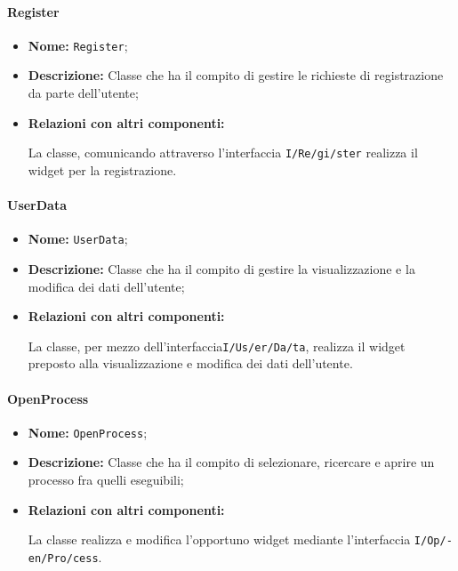 \paragraph{Register}
\begin{flushleft}
\begin{itemize}
\item \textbf{Nome:} \texttt{Register};
\item \textbf{Descrizione:} Classe che ha il compito di gestire le richieste di registrazione da parte dell'utente;
\item \textbf{Relazioni con altri componenti:}
\begin{sloppypar}
La classe, comunicando attraverso l'interfaccia \texttt{I\fshyp{}Re\fshyp{}gi\fshyp{}ster} realizza il widget per la registrazione.
\end{sloppypar}
\end{itemize}
\end{flushleft}

\paragraph{UserData}
\begin{flushleft}
\begin{itemize}
\item \textbf{Nome:} \texttt{UserData};
\item \textbf{Descrizione:} Classe che ha il compito di gestire la visualizzazione e la modifica dei dati dell'utente;
\item \textbf{Relazioni con altri componenti:}
\begin{sloppypar}
La classe, per mezzo dell'interfaccia\texttt{I\fshyp{}Us\fshyp{}er\fshyp{}Da\fshyp{}ta}, realizza il widget preposto alla visualizzazione e modifica dei dati dell'utente.
\end{sloppypar}
\end{itemize}
\end{flushleft}

\paragraph{OpenProcess}
\begin{flushleft}
\begin{itemize}
\item \textbf{Nome:} \texttt{OpenProcess};
\item \textbf{Descrizione:} Classe che ha il compito di selezionare, ricercare e aprire un processo fra quelli eseguibili;
\item \textbf{Relazioni con altri componenti:}
\begin{sloppypar}
La classe realizza e modifica l'opportuno widget mediante l'interfaccia \texttt{I\fshyp{}Op\fshyp{}en\fshyp{}Pro\fshyp{}cess}.
\end{sloppypar}
\end{itemize}
\end{flushleft}

